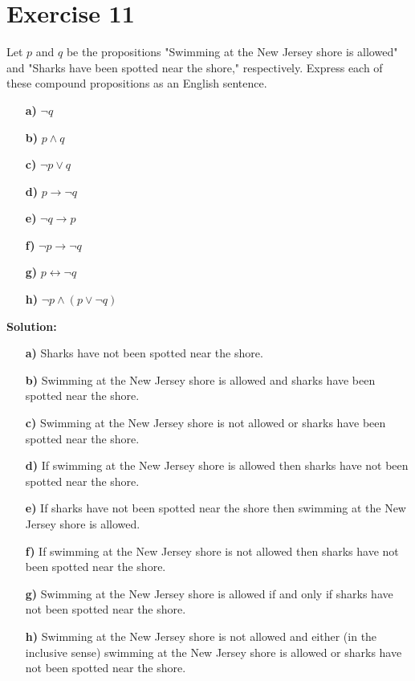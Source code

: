 \documentclass{Axon}
\begin{document}
\section*{Exercise 11}
Let \(p\) and \(q\) be the propositions "Swimming at the New Jersey shore is allowed" and "Sharks have been spotted near the shore," respectively. Express each of these compound propositions as an English sentence.
\begin{enumerate}
    \item[\textbf{a)}] \(\lnot q\)
    \item[\textbf{b)}] \(p \land q\)
    \item[\textbf{c)}] \(\lnot p \lor q\)
    \item[\textbf{d)}] \(p \to \lnot q\)
    \item[\textbf{e)}] \(\lnot q \to p\)
    \item[\textbf{f)}] \(\lnot p \to \lnot q\)
    \item[\textbf{g)}] \(p \leftrightarrow \lnot q\)
    \item[\textbf{h)}] \(\lnot p \land (p \lor \lnot q)\)
\end{enumerate}

\noindent
\textbf{Solution:}
\begin{enumerate}
    \item[\textbf{a)}] Sharks have not been spotted near the shore.
    \item[\textbf{b)}] Swimming at the New Jersey shore is allowed and sharks have been spotted near the shore.
    \item[\textbf{c)}] Swimming at the New Jersey shore is not allowed or sharks have been spotted near the shore.
    \item[\textbf{d)}] If swimming at the New Jersey shore is allowed then sharks have not been spotted near the shore.
    \item[\textbf{e)}] If sharks have not been spotted near the shore then swimming at the New Jersey shore is allowed.
    \item[\textbf{f)}] If swimming at the New Jersey shore is not allowed then sharks have not been spotted near the shore. 
    \item[\textbf{g)}] Swimming at the New Jersey shore is allowed if and only if sharks have not been spotted near the shore.
    \item[\textbf{h)}] Swimming at the New Jersey shore is not allowed and either (in the inclusive sense) swimming at the New Jersey shore is allowed or sharks have not been spotted near the shore.
\end{enumerate}
\end{document}
